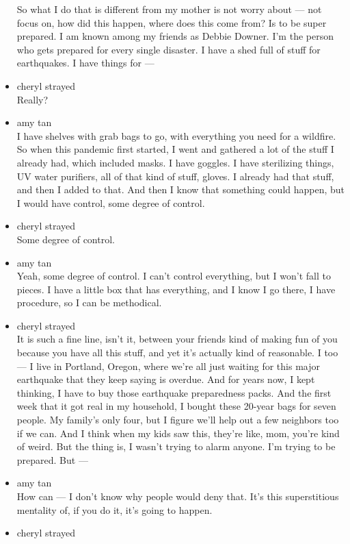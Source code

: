 \begin{itemize}
  So what I do that is different from my mother is not worry about ---
  not focus on, how did this happen, where does this come from? Is to be
  super prepared. I am known among my friends as Debbie Downer. I'm the
  person who gets prepared for every single disaster. I have a shed full
  of stuff for earthquakes. I have things for ---
\item
  cheryl strayed\\
  Really?
\item
  amy tan\\
  I have shelves with grab bags to go, with everything you need for a
  wildfire. So when this pandemic first started, I went and gathered a
  lot of the stuff I already had, which included masks. I have goggles.
  I have sterilizing things, UV water purifiers, all of that kind of
  stuff, gloves. I already had that stuff, and then I added to that. And
  then I know that something could happen, but I would have control,
  some degree of control.
\item
  cheryl strayed\\
  Some degree of control.
\item
  amy tan\\
  Yeah, some degree of control. I can't control everything, but I won't
  fall to pieces. I have a little box that has everything, and I know I
  go there, I have procedure, so I can be methodical.
\item
  cheryl strayed\\
  It is such a fine line, isn't it, between your friends kind of making
  fun of you because you have all this stuff, and yet it's actually kind
  of reasonable. I too --- I live in Portland, Oregon, where we're all
  just waiting for this major earthquake that they keep saying is
  overdue. And for years now, I kept thinking, I have to buy those
  earthquake preparedness packs. And the first week that it got real in
  my household, I bought these 20-year bags for seven people. My
  family's only four, but I figure we'll help out a few neighbors too if
  we can. And I think when my kids saw this, they're like, mom, you're
  kind of weird. But the thing is, I wasn't trying to alarm anyone. I'm
  trying to be prepared. But ---
\item
  amy tan\\
  How can --- I don't know why people would deny that. It's this
  superstitious mentality of, if you do it, it's going to happen.
\item
  cheryl strayed\\

\end{itemize}
